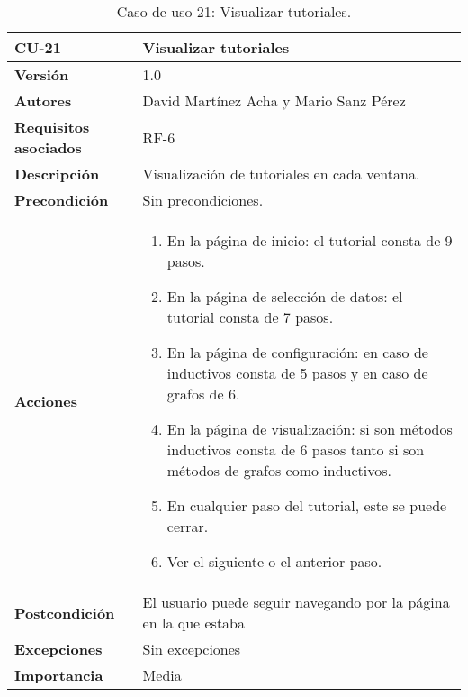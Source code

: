 \begin{table}[p]
	\centering
	\begin{tabularx}{\linewidth}{ p{} p{} }
		\toprule
		\textbf{CU-21}    & \textbf{Visualizar tutoriales}\\
		\toprule
		\textbf{Versión}              & 1.0    \\
		\textbf{Autores}                & David Martínez Acha y Mario Sanz Pérez\\
		\textbf{Requisitos asociados} & RF-6 \\
		\textbf{Descripción}          & Visualización de tutoriales en cada ventana. \\
		\textbf{Precondición}         & Sin precondiciones. \\
		\textbf{Acciones}             &
		\begin{enumerate}
			\def\labelenumi{\arabic{enumi}.}
			\tightlist
			\item En la página de inicio: el tutorial consta de 9 pasos.
			\item En la página de selección de datos: el tutorial consta de 7 pasos.
			\item En la página de configuración: en caso de inductivos consta de 5 pasos y en caso de grafos de 6.
			\item En la página de visualización: si son métodos inductivos consta de 6 pasos tanto si son métodos de grafos como inductivos.
			\item En cualquier paso del tutorial, este se puede cerrar.
			\item Ver el siguiente o el anterior paso.
		\end{enumerate}\\
		\textbf{Postcondición}        & El usuario puede seguir navegando por la página en la que estaba \\
		\textbf{Excepciones}          & Sin excepciones \\
		\textbf{Importancia}          & Media \\
		\bottomrule
	\end{tabularx}
	\caption{Caso de uso 21: Visualizar tutoriales.}
\end{table}